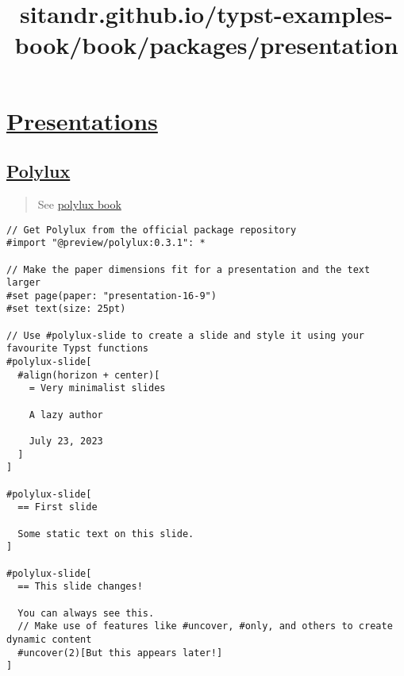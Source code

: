 \title{sitandr.github.io/typst-examples-book/book/packages/presentation}

\section{\texorpdfstring{\hyperref[presentations]{Presentations}}{Presentations}}\label{presentations}

\subsection{\texorpdfstring{\hyperref[polylux]{Polylux}}{Polylux}}\label{polylux}

\begin{quote}
See \href{https://polylux.dev/book/}{polylux book}
\end{quote}

\begin{verbatim}
// Get Polylux from the official package repository
#import "@preview/polylux:0.3.1": *

// Make the paper dimensions fit for a presentation and the text larger
#set page(paper: "presentation-16-9")
#set text(size: 25pt)

// Use #polylux-slide to create a slide and style it using your favourite Typst functions
#polylux-slide[
  #align(horizon + center)[
    = Very minimalist slides

    A lazy author

    July 23, 2023
  ]
]

#polylux-slide[
  == First slide

  Some static text on this slide.
]

#polylux-slide[
  == This slide changes!

  You can always see this.
  // Make use of features like #uncover, #only, and others to create dynamic content
  #uncover(2)[But this appears later!]
]
\end{verbatim}

\pandocbounded{}

\pandocbounded{}

\pandocbounded{}

\pandocbounded{}

